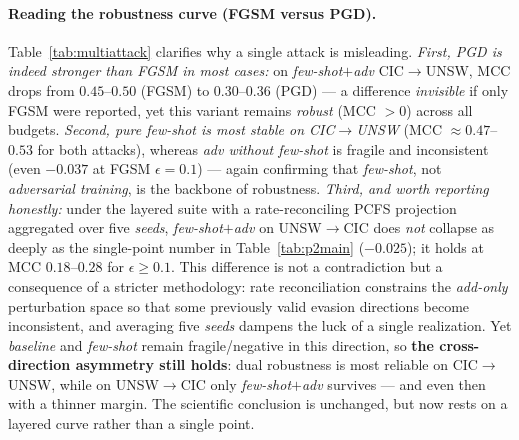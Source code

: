 \documentclass[preprint,12pt,authoryear]{elsarticle}
\begin{document}
\paragraph{Reading the robustness curve (FGSM versus PGD).}
Table~\ref{tab:multiattack} clarifies why a single attack is misleading.
\emph{First, PGD is indeed stronger than FGSM in most cases:} on \emph{few-shot$+$adv}
CIC$\rightarrow$UNSW, MCC drops from $0.45$--$0.50$ (FGSM) to $0.30$--$0.36$ (PGD)
--- a difference \emph{invisible} if only FGSM were reported, yet this variant
remains \emph{robust} (MCC $>0$) across all budgets. \emph{Second, pure few-shot is
most stable on CIC$\rightarrow$UNSW} (MCC $\approx 0.47$--$0.53$ for both attacks),
whereas \emph{adv without few-shot} is fragile and inconsistent (even $-0.037$ at
FGSM $\epsilon{=}0.1$) --- again confirming that \emph{few-shot}, not
\emph{adversarial training}, is the backbone of robustness. \emph{Third, and worth
reporting honestly:} under the layered suite with a rate-reconciling PCFS projection
aggregated over five \emph{seeds}, \emph{few-shot$+$adv} on UNSW$\rightarrow$CIC does
\emph{not} collapse as deeply as the single-point number in Table~\ref{tab:p2main}
($-0.025$); it holds at MCC $0.18$--$0.28$ for $\epsilon\ge0.1$. This difference is
not a contradiction but a consequence of a stricter methodology: rate reconciliation
constrains the \emph{add-only} perturbation space so that some previously valid
evasion directions become inconsistent, and averaging five \emph{seeds} dampens the
luck of a single realization. Yet \emph{baseline} and \emph{few-shot} remain
fragile/negative in this direction, so \textbf{the cross-direction asymmetry still
holds}: dual robustness is most reliable on CIC$\rightarrow$UNSW, while on
UNSW$\rightarrow$CIC only \emph{few-shot$+$adv} survives --- and even then with a
thinner margin. The scientific conclusion is unchanged, but now rests on a layered
curve rather than a single point.
\end{document}
